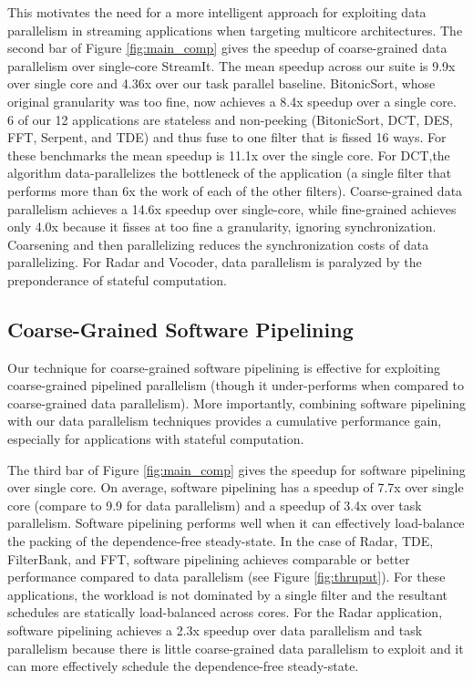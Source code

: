 This motivates the need for a more intelligent approach for exploiting
data parallelism in streaming applications when targeting multicore
architectures.  The second bar of Figure \ref{fig:main_comp} gives the
speedup of coarse-grained data parallelism over single-core
StreamIt. The mean speedup across our suite is 9.9x over single core
and 4.36x over our task parallel baseline.  BitonicSort, whose
original granularity was too fine, now achieves a 8.4x speedup over a
single core. 6 of our 12 applications are stateless and non-peeking
(BitonicSort, DCT, DES, FFT, Serpent, and TDE) and thus fuse to one
filter that is fissed 16 ways.  For these benchmarks the mean speedup
is 11.1x over the single core.  For DCT,the algorithm
data-parallelizes the bottleneck of the application (a single filter
that performs more than 6x the work of each of the other filters).
Coarse-grained data parallelism achieves a 14.6x speedup over
single-core, while fine-grained achieves only 4.0x because it fisses
at too fine a granularity, ignoring synchronization.  Coarsening and
then parallelizing reduces the synchronization costs of data
parallelizing.  For Radar and Vocoder, data parallelism is paralyzed
by the preponderance of stateful computation.

\subsection{Coarse-Grained Software Pipelining}

Our technique for coarse-grained software pipelining is effective for
exploiting coarse-grained pipelined parallelism (though it
under-performs when compared to coarse-grained data parallelism).
More importantly, combining software pipelining with our data
parallelism techniques provides a cumulative performance gain,
especially for applications with stateful computation.

The third bar of Figure \ref{fig:main_comp} gives the speedup for
software pipelining over single core.  On average, software pipelining
has a speedup of 7.7x over single core (compare to 9.9 for data
parallelism) and a speedup of 3.4x over task parallelism. Software
pipelining performs well when it can effectively load-balance the
packing of the dependence-free steady-state.  In the case of Radar,
TDE, FilterBank, and FFT, software pipelining achieves comparable or
better performance compared to data parallelism (see Figure
\ref{fig:thruput}).  For these applications, the workload is not
dominated by a single filter and the resultant schedules are
statically load-balanced across cores.  For the Radar application,
software pipelining achieves a 2.3x speedup over data parallelism and
task parallelism because there is little coarse-grained data
parallelism to exploit and it can more effectively schedule the
dependence-free steady-state.

